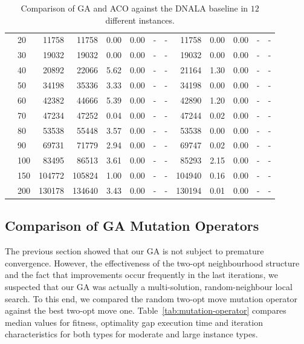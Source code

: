 \documentclass[12pt]{article}
\begin{document}
\begin{table}
{\begin{tabular}{llr|rrrrr|rrrrr}
   & 20  &    11758 &    11758 &   0.00 &   0.00 &          - &                  - &    11758 &  0.00 &   0.00 &          - &                  - \\
   & 30  &    19032 &    19032 &   0.00 &   0.00 &          - &                  - &    19032 &  0.00 &   0.00 &          - &                  - \\
   & 40  &    20892 &    22066 &   5.62 &   0.00 &          - &                  - &    21164 &  1.30 &   0.00 &          - &                  - \\
   & 50  &    34198 &    35336 &   3.33 &   0.00 &          - &                  - &    34198 &  0.00 &   0.00 &          - &                  - \\
   & 60  &    42382 &    44666 &   5.39 &   0.00 &          - &                  - &    42890 &  1.20 &   0.00 &          - &                  - \\
   & 70  &    47234 &    47252 &   0.04 &   0.00 &          - &                  - &    47244 &  0.02 &   0.00 &          - &                  - \\
   & 80  &    53538 &    55448 &   3.57 &   0.00 &          - &                  - &    53538 &  0.00 &   0.00 &          - &                  - \\
   & 90  &    69731 &    71779 &   2.94 &   0.00 &          - &                  - &    69747 &  0.02 &   0.00 &          - &                  - \\
   & 100 &    83495 &    86513 &   3.61 &   0.00 &          - &                  - &    85293 &  2.15 &   0.00 &          - &                  - \\
   & 150 &   104772 &   105824 &   1.00 &   0.00 &          - &                  - &   104940 &  0.16 &   0.00 &          - &                  - \\
   & 200 &   130178 &   134640 &   3.43 &   0.00 &          - &                  - &   130194 &  0.01 &   0.00 &          - &                  - \\

\bottomrule
\end{tabular}%
}
\label{tab:main}
\caption{Comparison of GA and ACO against the DNALA baseline in $12$ different instances.}
\end{table}


\subsection{Comparison of GA Mutation Operators}
The previous section showed that our GA is not subject to premature convergence. However, the effectiveness of the two-opt neighbourhood structure and the fact that improvements occur frequently in the last iterations, we suspected that our GA was actually a multi-solution, random-neighbour local search. To this end, we compared the random two-opt move mutation operator against the best two-opt move one. Table~\ref{tab:mutation-operator} compares median values for fitness, optimality gap execution time and iteration characteristics for both types for moderate and large instance types. 
\end{document}
